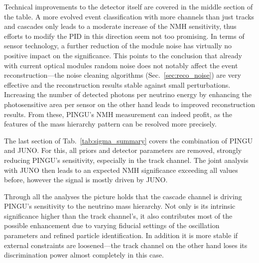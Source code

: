 Technical improvements to the detector itself are covered in the middle section 
of the table. A more evolved event classification with more channels than just 
tracks and cascades only leads to a moderate increase of the NMH sensitivity, 
thus efforts to modify the PID in this direction seem not too promising. In 
terms of sensor technology, a further reduction of the module noise has 
virtually no positive impact on the significance. This points to the conclusion 
that already with current optical modules random noise does not notably affect 
the event reconstruction---the noise cleaning algorithms 
(Sec.~\ref{sec:reco_noise}) are very effective and the reconstruction results 
stable against small perturbations. Increasing the number of detected photons 
per neutrino energy by enhancing the photosensitive area per sensor on the 
other hand leads to improved reconstruction results. From these, PINGU's NMH 
measurement can indeed profit, as the features of the mass hierarchy pattern 
can be resolved more precisely.

The last section of Tab.~\ref{tab:sigma_summary} covers the combination of
PINGU and JUNO. For this, all priors and detector parameters are removed,
strongly reducing PINGU's sensitivity, especially in the track channel. The
joint analysis with JUNO then leads to an expected NMH significance exceeding
all values before, however the signal is mostly driven by JUNO.

Through all the analyses the picture holds that the cascade channel is driving
PINGU's sensitivity to the neutrino mass hierarchy. Not only is its intrinsic
significance higher than the track channel's, it also contributes most of the
possible enhancement due to varying fiducial settings of the oscillation
parameters and refined particle identification. In addition it is more stable
if external constraints are loosened---the track channel on the other hand
loses its discrimination power almost completely in this case.